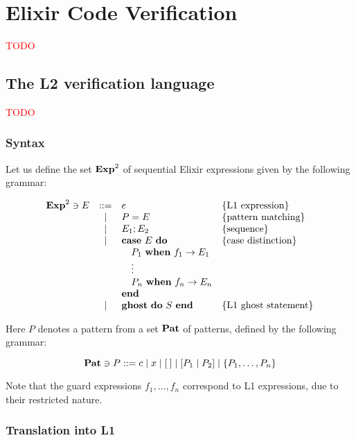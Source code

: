 \chapter{Elixir Code Verification}
\label{cap:elixirCodeVerification}


\textcolor{red}{TODO}

\section{The L2 verification language}

\textcolor{red}{TODO}

\subsection{Syntax}

Let us define the set $\mathbf{Exp}^{2}$ of sequential Elixir expressions given by the 
following grammar:

\[
\begin{array}{rcll}
\mathbf{Exp}^{2} \ni E & ::= & e & \{ \textrm{L1 expression} \} \\
& | & P = E & \{ \textrm{pattern matching} \} \\
& | & E_1; E_2 & \{ \textrm{sequence} \} \\
& | & \textbf{case}~E~\textbf{do} & \{ \textrm{case distinction} \} \\
& & \quad P_1~\textbf{when}~f_1 \rightarrow E_1 \\
& & \quad \vdots\\
& & \quad P_n~\textbf{when}~f_n \rightarrow E_n \\
& & \textbf{end} \\
& | & \textbf{ghost}~\textbf{do}~S~\textbf{end} & \{ \textrm{L1 ghost statement} \} \\
\end{array}
\]

Here $P$ denotes a pattern from a set $\mathbf{Pat}$ of patterns, defined by the 
following grammar:

\[
\mathbf{Pat} \ni P ::= c \mid x \mid [\:] \mid [P_1 \mid P_2] \mid \{ P_1, \ldots, P_n \}
\]

Note that the guard expressions $f_1, \ldots, f_n$ correspond to L1 expressions, due 
to their restricted nature.

\subsection{Translation into L1}

